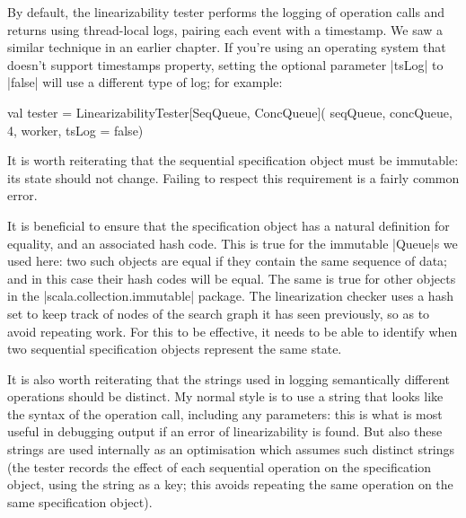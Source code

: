 By default, the linearizability tester performs the logging of operation calls
and returns using thread-local logs, pairing each event with a timestamp.  We
saw a similar technique in an earlier chapter.  If you're using an operating
system that doesn't support timestamps property, setting the optional
parameter |tsLog| to |false| will use a different type of log; for example:
%
\begin{scala}
  val tester = LinearizabilityTester[SeqQueue, ConcQueue](
    seqQueue, concQueue, 4, worker, tsLog = false)
\end{scala}

It is worth reiterating that the sequential specification object must be
immutable: its state should not change.  Failing to respect this requirement
is a fairly common error.

It is beneficial to ensure that the specification object has a natural
definition for equality, and an associated hash code.  This is true for the
immutable |Queue|s we used here: two such objects are equal if they contain
the same sequence of data; and in this case their hash codes will be equal.
The same is true for other objects in the |scala.collection.immutable|
package.  The linearization checker uses a hash set to keep track of nodes of
the search graph it has seen previously, so as to avoid repeating work.  For
this to be effective, it needs to be able to identify when two sequential
specification objects represent the same state.

It is also worth reiterating that the strings used in logging semantically
different operations should be distinct.  My normal style is to use a string
that looks like the syntax of the operation call, including any parameters:
this is what is most useful in debugging output if an error of linearizability
is found.  But also these strings are used internally as an optimisation which
assumes such distinct strings (the tester records the effect of each
sequential operation on the specification object, using the string as a key;
this avoids repeating the same operation on the same specification object).

